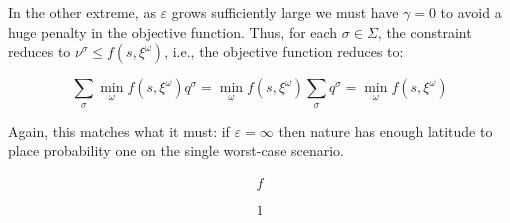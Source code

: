 In the other extreme, as $\varepsilon$ grows sufficiently large we must have $\gamma = 0$
to avoid a huge penalty in the objective function. Thus, for each $\sigma \in \Sigma$,
the constraint reduces to $\nu^\sigma \le f(s, \xi^\omega)$, i.e.,
the objective function reduces to:

\begin{equation}
\sum_\sigma \min_\omega f(s, \xi^\omega) q^\sigma = \min_\omega f(s, \xi^\omega) \sum_\sigma q^\sigma = \min_\omega f(s, \xi^\omega)
\end{equation}

Again, this matches what it must: if $\varepsilon = \infty$ then nature has enough latitude
to place probability one on the single worst-case scenario.

\begin{subequations}\label{WassersteinEq}
\begin{eqnarray}
f
\end{eqnarray}
\end{subequations}

\begin{equation}
1
\end{equation}
